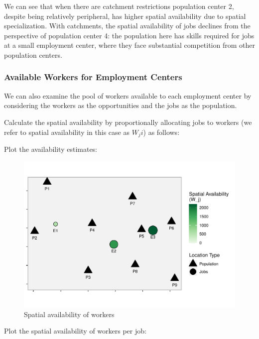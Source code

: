 \documentclass[]{elsarticle} %
\begin{document}
We can see that when there are catchment restrictions population center
2, despite being relatively peripheral, has higher spatial availability
due to spatial specialization. With catchments, the spatial availability
of jobs declines from the perspective of population center 4: the
population here has skills required for jobs at a small employment
center, where they face substantial competition from other population
centers.

\hypertarget{available-workers-for-employment-centers}{%
\subsubsection{Available Workers for Employment
Centers}\label{available-workers-for-employment-centers}}

We can also examine the pool of workers available to each employment
center by considering the workers as the opportunities and the jobs as
the population.

Calculate the spatial availability by proportionally allocating jobs to
workers (we refer to spatial availability in this case as \(W_ji\)) as
follows:

Plot the availability estimates:

\begin{figure}
\includegraphics[width=1\linewidth]{Spatial-Availability_files/figure-latex/toy-example-availability-workers-1} \caption{\label{fig:toy-example-availability-workers}Spatial availability of workers}\label{fig:toy-example-availability-workers}
\end{figure}

Plot the spatial availability of workers per job:
\end{document}
